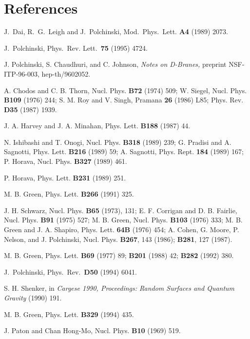 \section*{References}
\begin{thebibliography}{99}

J.~Dai, R.~G.~Leigh and J.~Polchinski, Mod.~Phys.~Lett.
{\bf A4} (1989) 2073.

J.~Polchinski, Phys.~Rev. Lett.~{\bf 75} (1995) 4724.

J. Polchinski, S. Chaudhuri, and C. Johnson, {\it Notes on
D-Branes,} preprint NSF-ITP-96-003, hep-th/9602052.

A. Chodos and C. B. Thorn, Nucl. Phys. {\bf B72} (1974) 509;\hfil\break
W. Siegel, Nucl. Phys. {\bf B109} (1976) 244;\hfil\break
S. M. Roy and V. Singh, Pramana {\bf 26} (1986) L85; Phys. Rev. {\bf D35}
(1987) 1939.

J. A. Harvey and J. A. Minahan, Phys. Lett. {\bf B188} (1987) 44.

N. Ishibashi and T. Onogi, Nucl. Phys. {\bf B318} (1989) 239;\hfil\break
G. Pradisi and A. Sagnotti, Phys. Lett. {\bf B216} (1989) 59;\hfil\break
A. Sagnotti, Phys. Rept. {\bf 184} (1989) 167;\hfil\break 
P. Horava, Nucl. Phys. {\bf B327} (1989) 461.

P. Horava, Phys. Lett. {\bf B231} (1989) 251.

M. B. Green, Phys. Lett. {\bf B266} (1991) 325. 

J. H. Schwarz, Nucl. Phys. {\bf B65} (1973), 131;\hfil\break  
E. F. Corrigan and D. B. Fairlie, Nucl. Phys. {\bf B91} (1975)
527;\hfil\break 
M. B. Green, Nucl. Phys. {\bf B103} (1976) 333;\hfil\break 
M. B. Green and J. A. Shapiro, Phys. Lett. {\bf 64B} (1976) 454;\hfil\break 
A. Cohen, G. Moore, P. Nelson, and J. Polchinski, Nucl. Phys. {\bf B267}, 143
(1986); {\bf B281}, 127 (1987).

M. B. Green, Phys. Lett. {\bf B69} (1977) 89; {\bf
B201} (1988) 42; {\bf B282} (1992) 380.

J.~Polchinski, Phys.~Rev.~{\bf D50} (1994) 6041.

S. H. Shenker, in {\it Cargese 1990, Proceedings:  Random Surfaces and Quantum
Gravity} (1990) 191.

M. B. Green, Phys. Lett. {\bf B329} (1994) 435.

J. Paton and Chan Hong-Mo, Nucl. Phys. {\bf B10} (1969)
519.


\end{thebibliography}
